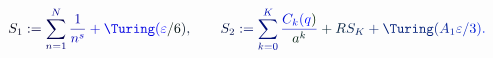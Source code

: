 \documentclass[12pt]{article}
\begin{document}
\makeatletter
\renewcommand*{\@textcolor}[3]{%
  \protect\leavevmode
  \begingroup
    \color#1{#2}#3%
  \endgroup
}
\makeatother
\begin{displaymath}
\mathcolor[RGB]{0,0,15}{S} _ { \mathcolor[RGB]{0,0,30}{1} } \mathcolor[RGB]{0,0,45}{:} \mathcolor[RGB]{0,0,60}{=} \mathcolor[RGB]{0,0,75}{\sum} _ { \mathcolor[RGB]{0,0,90}{n} \mathcolor[RGB]{0,0,105}{=} \mathcolor[RGB]{0,0,120}{1} } ^ { \mathcolor[RGB]{0,0,135}{N} } \mathcolor[RGB]{0,0,150}{\frac { \mathcolor[RGB]{0,0,165}{1} } { \mathcolor[RGB]{0,0,180}{n} ^ { \mathcolor[RGB]{0,0,195}{s} } } } \mathcolor[RGB]{0,0,210}{+} \mathcolor[RGB]{0,0,225}{\Turing} \mathcolor[RGB]{0,0,240}{(} \mathcolor[RGB]{0,0,255}{\varepsilon} \mathcolor[RGB]{0,15,0}{/} \mathcolor[RGB]{0,15,15}{6} \mathcolor[RGB]{0,15,30}{)} \mathcolor[RGB]{0,15,45}{,} \mathcolor[RGB]{0,15,60}{\qquad
S} _ { \mathcolor[RGB]{0,15,75}{2} } \mathcolor[RGB]{0,15,90}{:} \mathcolor[RGB]{0,15,105}{=} \mathcolor[RGB]{0,15,120}{\sum} _ { \mathcolor[RGB]{0,15,135}{k} \mathcolor[RGB]{0,15,150}{=} \mathcolor[RGB]{0,15,165}{0} } ^ { \mathcolor[RGB]{0,15,180}{K} } \mathcolor[RGB]{0,15,195}{\frac { \mathcolor[RGB]{0,15,210}{C} _ { \mathcolor[RGB]{0,15,225}{k} } \mathcolor[RGB]{0,15,240}{(} \mathcolor[RGB]{0,15,255}{q} \mathcolor[RGB]{0,30,0}{)} } { \mathcolor[RGB]{0,30,15}{a} ^ { \mathcolor[RGB]{0,30,30}{k} } } } \mathcolor[RGB]{0,30,45}{+} \mathcolor[RGB]{0,30,60}{R} \mathcolor[RGB]{0,30,75}{S} _ { \mathcolor[RGB]{0,30,90}{K} } \mathcolor[RGB]{0,30,105}{+} \mathcolor[RGB]{0,30,120}{\Turing} \mathcolor[RGB]{0,30,135}{(} \mathcolor[RGB]{0,30,150}{A} _ { \mathcolor[RGB]{0,30,165}{1} } \mathcolor[RGB]{0,30,180}{\varepsilon} \mathcolor[RGB]{0,30,195}{/} \mathcolor[RGB]{0,30,210}{3} \mathcolor[RGB]{0,30,225}{)} \mathcolor[RGB]{0,30,240}{.}
\end{displaymath}
\end{document}
